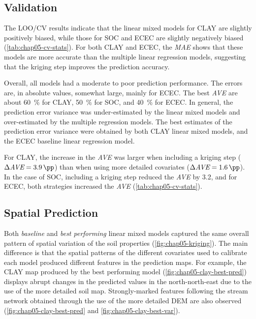\subsection{Validation}

The LOO\-/CV results indicate that the linear mixed models for CLAY are slightly positively biased, while 
those for SOC and ECEC are slightly negatively biased (\autoref{tab:chap05-cv-stats}). For both CLAY and ECEC, 
the \textit{MAE} shows that these models are more accurate than the multiple linear regression models, 
suggesting that the kriging step improves the prediction accuracy.



Overall, all models had a moderate to poor prediction performance. The errors are, in absolute values, 
somewhat large, mainly for ECEC. The best \textit{AVE} are about \SI{60}{\percent} for CLAY, \SI{50}{\percent} 
for SOC, and \SI{40}{\percent} for ECEC. In general, the prediction error variance was under-estimated by the 
linear mixed models and over-estimated by the multiple regression models. The best estimates of the prediction 
error variance were obtained by both CLAY linear mixed models, and the ECEC baseline linear regression model.

For CLAY, the increase in the \textit{AVE} was larger when including a kriging step ($\Delta\textit{AVE} = 
\SI{3.9}{\pp}$) than when using more detailed covariates ($\Delta\textit{AVE} = \SI{1.6}{\pp}$). In the case 
of SOC, including a kriging step reduced the \textit{AVE} by \SI{3.2}{\pp}, and for ECEC, both strategies 
increased the \textit{AVE} (\autoref{tab:chap05-cv-stats}).

\subsection{Spatial Prediction}

Both \emph{baseline} and \emph{best performing} linear mixed models captured the same overall pattern of 
spatial variation of the soil properties (\autoref{fig:chap05-kriging}). The main difference is that the 
spatial patterns of the different covariates used to calibrate each model produced different features in the 
prediction maps. For example, the CLAY map produced by the best performing model 
(\autoref{fig:chap05-clay-best-pred}) displays abrupt changes in the predicted values in the north-north-east 
due to the use of the more detailed soil map. Strongly-marked features following the stream network obtained 
through the use of the more detailed DEM are also observed (\autoref{fig:chap05-clay-best-pred} and 
\autoref{fig:chap05-clay-best-var}).

